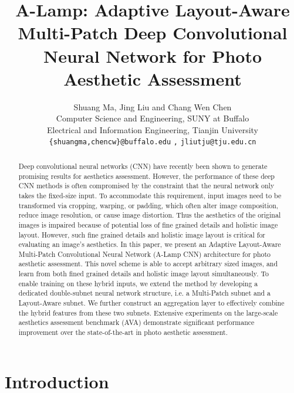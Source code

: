 \documentclass[10pt,twocolumn,letterpaper]{article}
\begin{document}
	
\title{A-Lamp: Adaptive Layout-Aware Multi-Patch Deep Convolutional Neural Network for Photo Aesthetic Assessment}
	
		
	\author{Shuang Ma{},
Jing Liu{} and
		Chang Wen Chen{}\\
		{}Computer Science and Engineering, SUNY at Buffalo\\ {}Electrical and Information Engineering, Tianjin University\\
		{\tt\small \{shuangma,chencw\}@buffalo.edu} {\tt\small,} {\tt\small jliutju@tju.edu.cn}
	}
\maketitle
\begin{abstract}			
		Deep convolutional neural networks (CNN) have recently been shown to generate promising results for aesthetics assessment. However, the performance of these deep CNN methods is often compromised by the constraint that the neural network only takes the fixed-size input. To accommodate this requirement, input images need to be transformed via cropping, warping, or padding, which often alter image composition, reduce image resolution, or cause image distortion. Thus the aesthetics of the original images is impaired because of potential loss of fine grained details and holistic image layout. However, such fine grained details and holistic image layout is critical for evaluating an image's aesthetics. 
		In this paper, we present an Adaptive Layout-Aware Multi-Patch Convolutional Neural Network (A-Lamp CNN) architecture for photo aesthetic assessment. This novel scheme is able to accept arbitrary sized images, and learn from both fined grained details and holistic image layout simultaneously. To enable training on these hybrid inputs, we extend the method by developing a dedicated double-subnet neural network structure, i.e. a Multi-Patch subnet and a Layout-Aware subnet. We further construct an aggregation layer to effectively combine the hybrid features from these two subnets. Extensive experiments on the large-scale aesthetics assessment benchmark (AVA) demonstrate significant performance improvement over the state-of-the-art in photo aesthetic assessment.
		
	\end{abstract}
	
\section{Introduction} \label{intro}
	
\end{document}
